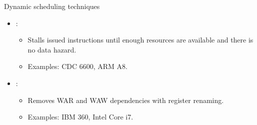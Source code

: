 \begin{frame}[t]{Dynamic scheduling techniques}
\begin{itemize}
  \item {}:
    \begin{itemize}
      \item Stalls issued instructions until enough resources are available and there is no data hazard.
      \item Examples: CDC 6600, ARM A8.
    \end{itemize}

  \item {}:
    \begin{itemize}
      \item Removes WAR and WAW dependencies with register renaming.
      \item Examples: IBM 360, Intel Core i7.
    \end{itemize}
\end{itemize}
\end{frame}
